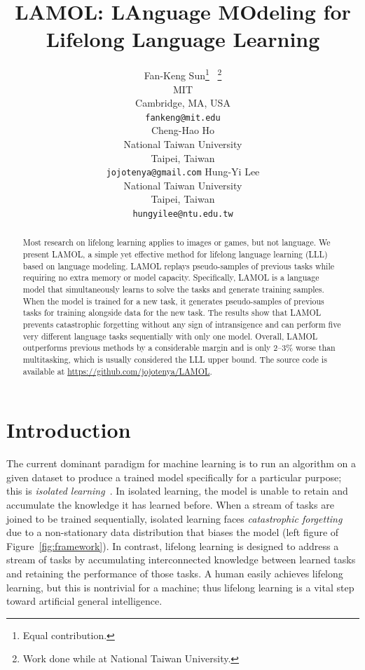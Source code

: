 \documentclass{article} %
\title{LAMOL: LAnguage MOdeling for \\
Lifelong Language Learning}
\author{Fan-Keng Sun\thanks{Equal contribution.} \, \thanks{Work done while at National Taiwan University.} \\
MIT \\
Cambridge, MA, USA \\
\texttt{fankeng@mit.edu} \\
\And
Cheng-Hao Ho\footnotemark[1] \\
National Taiwan University \\
Taipei, Taiwan \\
\texttt{jojotenya@gmail.com}
\And
Hung-Yi Lee \\
National Taiwan University \\
Taipei, Taiwan \\
\texttt{hungyilee@ntu.edu.tw}
}
\begin{document}
\maketitle

\begin{abstract}
Most research on lifelong learning applies to images or games, but not language.
We present LAMOL, a simple yet effective method for lifelong language learning (LLL) based on language modeling.
LAMOL replays pseudo-samples of previous tasks while requiring no extra memory or model capacity.
Specifically, LAMOL is a language model that simultaneously learns to solve the tasks and generate training samples.
When the model is trained for a new task, it generates pseudo-samples of previous tasks for training alongside data for the new task.
The results show that LAMOL prevents catastrophic forgetting without any sign of intransigence and can perform five very different language tasks sequentially with only one model. 
Overall, LAMOL outperforms previous methods by a considerable margin and is only 2--3\% worse than multitasking, which is usually considered the LLL upper bound.
The source code is available at \url{https://github.com/jojotenya/LAMOL}.
\end{abstract}

\section{Introduction}\label{sec:introduction}

The current dominant paradigm for machine learning is to run an algorithm on a given dataset to produce a trained model specifically for a particular purpose; this is \emph{isolated learning}~\citep[p.~150]{lll_book}. 
In isolated learning, the model is unable to retain and accumulate the knowledge it has learned before. 
When a stream of tasks are joined to be trained sequentially, isolated learning faces \emph{catastrophic forgetting}~\citep{mccloskey1989catastrophic} due to a non-stationary data distribution that biases the model (left figure of Figure~\ref{fig:framework}).
In contrast, lifelong learning is designed to address a stream of tasks by accumulating interconnected knowledge between learned tasks and retaining the performance of those tasks.
A human easily achieves lifelong learning, but this is nontrivial for a machine; thus lifelong learning is a vital step toward artificial general intelligence.

\end{document}
